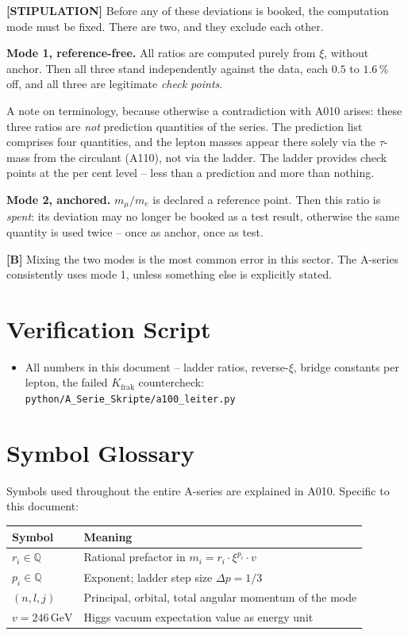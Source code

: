 \textbf{[STIPULATION]} Before any of these deviations is booked, the computation
mode must be fixed. There are two, and they exclude each other.

\textbf{Mode 1, reference-free.} All ratios are computed purely from $\xi$,
without anchor. Then all three stand independently against the data, each
$0{.}5$ to $1{.}6\,\%$ off, and all three are legitimate \emph{check points}.

A note on terminology, because otherwise a contradiction with A010 arises: these
three ratios are \emph{not} prediction quantities of the series. The prediction
list comprises four quantities, and the lepton masses appear there solely via the
$\tau$-mass from the circulant (A110), not via the ladder. The ladder provides
check points at the per cent level -- less than a prediction and more than nothing.

\textbf{Mode 2, anchored.} $m_\mu/m_e$ is declared a reference point. Then this
ratio is \emph{spent}: its deviation may no longer be booked as a test result,
otherwise the same quantity is used twice -- once as anchor, once as test.

\textbf{[B]} Mixing the two modes is the most common error in this sector. The
A-series consistently uses mode 1, unless something else is explicitly stated.

\section{Verification Script}

\begin{itemize}
  \item All numbers in this document -- ladder ratios, reverse-$\xi$, bridge
    constants per lepton, the failed $K_\text{frak}$ countercheck:
    \texttt{python/A\_Serie\_Skripte/a100\_leiter.py}
\end{itemize}

\section{Symbol Glossary}

Symbols used throughout the entire A-series are explained in A010.
Specific to this document:

\begin{center}
\renewcommand{\arraystretch}{1.3}
{\small\begin{tabular}{lp{9cm}}
\toprule
Symbol & Meaning \\
\midrule
$r_i\in\mathbb{Q}$ & Rational prefactor in $m_i=r_i\cdot\xi^{p_i}\cdot v$ \\
$p_i\in\mathbb{Q}$ & Exponent; ladder step size $\Delta p=1/3$ \\
$(n,l,j)$ & Principal, orbital, total angular momentum of the mode \\
$v=246\,\text{GeV}$ & Higgs vacuum expectation value as energy unit \\
\bottomrule
\end{tabular}}
\renewcommand{\arraystretch}{1.0}
\end{center}

